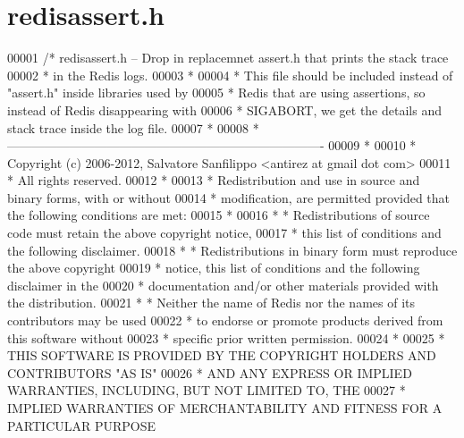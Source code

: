 \hypertarget{redisassert_8h_source}{}\section{redisassert.\+h}
\label{redisassert_8h_source}

\begin{DoxyCode}
00001 \textcolor{comment}{/* redisassert.h -- Drop in replacemnet assert.h that prints the stack trace}
00002 \textcolor{comment}{ *                  in the Redis logs.}
00003 \textcolor{comment}{ *}
00004 \textcolor{comment}{ * This file should be included instead of "assert.h" inside libraries used by}
00005 \textcolor{comment}{ * Redis that are using assertions, so instead of Redis disappearing with}
00006 \textcolor{comment}{ * SIGABORT, we get the details and stack trace inside the log file.}
00007 \textcolor{comment}{ *}
00008 \textcolor{comment}{ * ----------------------------------------------------------------------------}
00009 \textcolor{comment}{ *}
00010 \textcolor{comment}{ * Copyright (c) 2006-2012, Salvatore Sanfilippo <antirez at gmail dot com>}
00011 \textcolor{comment}{ * All rights reserved.}
00012 \textcolor{comment}{ *}
00013 \textcolor{comment}{ * Redistribution and use in source and binary forms, with or without}
00014 \textcolor{comment}{ * modification, are permitted provided that the following conditions are met:}
00015 \textcolor{comment}{ *}
00016 \textcolor{comment}{ *   * Redistributions of source code must retain the above copyright notice,}
00017 \textcolor{comment}{ *     this list of conditions and the following disclaimer.}
00018 \textcolor{comment}{ *   * Redistributions in binary form must reproduce the above copyright}
00019 \textcolor{comment}{ *     notice, this list of conditions and the following disclaimer in the}
00020 \textcolor{comment}{ *     documentation and/or other materials provided with the distribution.}
00021 \textcolor{comment}{ *   * Neither the name of Redis nor the names of its contributors may be used}
00022 \textcolor{comment}{ *     to endorse or promote products derived from this software without}
00023 \textcolor{comment}{ *     specific prior written permission.}
00024 \textcolor{comment}{ *}
00025 \textcolor{comment}{ * THIS SOFTWARE IS PROVIDED BY THE COPYRIGHT HOLDERS AND CONTRIBUTORS "AS IS"}
00026 \textcolor{comment}{ * AND ANY EXPRESS OR IMPLIED WARRANTIES, INCLUDING, BUT NOT LIMITED TO, THE}
00027 \textcolor{comment}{ * IMPLIED WARRANTIES OF MERCHANTABILITY AND FITNESS FOR A PARTICULAR PURPOSE}

\end{DoxyCode}
